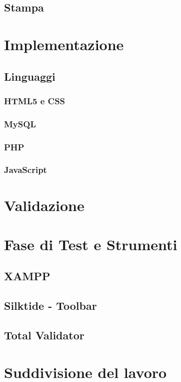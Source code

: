 \documentclass[a4paper, dvipsnames, table]{article}
\begin{document}
	\subsection{Stampa}
		

\newpage
\section{Implementazione}
	\subsection{Linguaggi}
		\subsubsection{HTML5 e CSS}
			
		\subsubsection{MySQL}
			
		\subsubsection{PHP}
			
		\subsubsection{JavaScript}
			

\newpage
\section{Validazione}
	

\newpage
\section{Fase di Test e Strumenti}
	\subsection{XAMPP}
		
	\subsection{Silktide - Toolbar}
		
	\subsection{Total Validator}
		
	
\newpage
\section{Suddivisione del lavoro}
	
\end{document}
